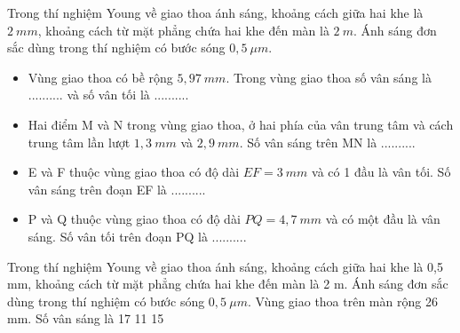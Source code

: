 \begin{vidu}
Trong thí nghiệm Young về giao thoa ánh sáng, khoảng cách giữa hai khe là $2\ mm$, khoảng cách từ mặt phẳng chứa hai khe đến màn là $2\ m$. Ánh sáng đơn sắc dùng trong thí nghiệm có bước sóng $0,5 \ \mu m$. 
\begin{itemize}
\item [1.] Vùng giao thoa có bề rộng $5,97\ mm$. Trong vùng giao thoa số vân sáng là .......... và số vân tối là ..........
\item [2.] Hai điểm M và N trong vùng giao thoa, ở hai phía của vân trung tâm và cách trung tâm lần lượt $1,3\ mm$ và $2,9\ mm$. Số vân sáng trên MN là ..........
\item [3.] E và F thuộc vùng giao thoa có độ dài $EF=3\ mm$ và có 1 đầu là vân tối. Số vân sáng trên đoạn EF là ..........
\item [4.] P và Q thuộc vùng giao thoa có độ dài $PQ=4,7\ mm$ và có một đầu là vân sáng. Số vân tối trên đoạn PQ là ..........
\end{itemize}
\end{vidu} %
\begin{vidu}%
Trong thí nghiệm Young về giao thoa ánh sáng, khoảng cách giữa hai khe là 0,5 mm, khoảng cách từ mặt phẳng chứa hai khe đến màn là 2 m. Ánh sáng đơn sắc dùng trong thí nghiệm có bước sóng $0,5 \ \mu m$. Vùng giao thoa trên màn rộng 26 mm. Số vân sáng là
\choice
{17}
{11}
{}
{15}
\end{vidu} %
